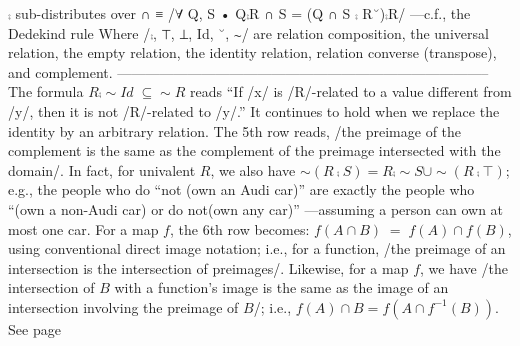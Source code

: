 \documentclass[11pt]{article}
\begin{document}
⨾ sub-distributes over ∩ ≡ \quad /∀ Q, S • Q⨾R ∩ S = (Q ∩ S ⨾ R˘)⨾R/ \quad  \quad  \quad  ---c.f., the Dedekind rule  Where /⨾, ⊤, ⊥, Id, ˘, ∼/ are relation composition, the universal relation, the empty relation, the identity relation, relation converse (transpose), and complement. -------------------------------------------------------------------------------- The formula $R ⨾ ∼ Id \;⊆ ∼ R$ reads “If /x/ is /R/-related to a value different from /y/, then it is not /R/-related to /y/.” \quad It continues to hold when we replace the identity by an arbitrary relation.  The 5th row reads, /the preimage of the complement is the same as the complement of the preimage intersected with the domain/. \quad In fact, for univalent $R$, we also have $∼(R ⨾ S) = R ⨾ ∼ S ∪ ∼(R ⨾ ⊤)$; e.g., the people who do “not (own an Audi car)” are exactly the people who “(own a non-Audi car) or do not(own any car)” ---assuming a person can own at most one car.  For a map $f$, the 6th row becomes: $f(A ∩ B) \;=\; f(A) ∩ f(B)$, using conventional direct image notation; i.e., for a function, /the preimage of an intersection is the intersection of preimages/.  Likewise, for a map $f$, we have /the intersection of $B$ with a function's image is the same as the image of an intersection involving the preimage of $B$/; i.e., $f(A) ∩ B = f(A ∩ f^{-1}(B))$. See page \pageref{org-special-block-extras-glossary-declaration-site-Univalent}
\end{document}
